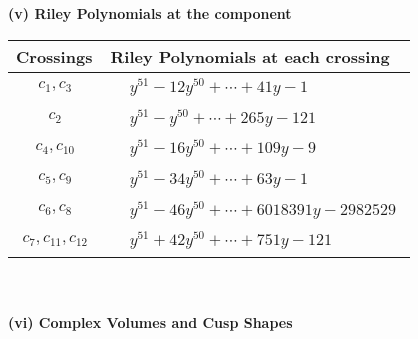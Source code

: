 \documentclass[1p]{elsarticle_modified}
\theoremstyle{definition}
\begin{document}
\newpage\renewcommand{\arraystretch}{1}
\flushleft \textbf{(v) Riley Polynomials at the component}\newline \\
\begin{tabular}{m{50pt}|m{274pt}}
Crossings & \hspace{64pt}Riley Polynomials at each crossing \\
\hline $$\begin{aligned}c_{1},c_{3}\end{aligned}$$&$\begin{aligned}
&y^{51}-12 y^{50}+\cdots+41 y-1
\end{aligned}$\\
\hline $$\begin{aligned}c_{2}\end{aligned}$$&$\begin{aligned}
&y^{51}- y^{50}+\cdots+265 y-121
\end{aligned}$\\
\hline $$\begin{aligned}c_{4},c_{10}\end{aligned}$$&$\begin{aligned}
&y^{51}-16 y^{50}+\cdots+109 y-9
\end{aligned}$\\
\hline $$\begin{aligned}c_{5},c_{9}\end{aligned}$$&$\begin{aligned}
&y^{51}-34 y^{50}+\cdots+63 y-1
\end{aligned}$\\
\hline $$\begin{aligned}c_{6},c_{8}\end{aligned}$$&$\begin{aligned}
&y^{51}-46 y^{50}+\cdots+6018391 y-2982529
\end{aligned}$\\
\hline $$\begin{aligned}c_{7},c_{11},c_{12}\end{aligned}$$&$\begin{aligned}
&y^{51}+42 y^{50}+\cdots+751 y-121
\end{aligned}$\\
\hline
\end{tabular}\\~\\
\newpage\flushleft \textbf{(vi) Complex Volumes and Cusp Shapes}
\end{document}
